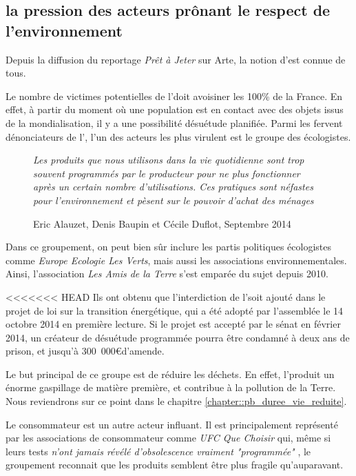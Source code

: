 \subsection{la pression des acteurs prônant le respect de l'environnement }

Depuis la diffusion du reportage \textit{Prêt à Jeter} sur Arte, la notion d'\op est connue de tous. 

Le nombre de victimes potentielles de l'\op doit avoisiner les 100\% de la France. En effet, à partir du moment où une population est en contact avec des objets issus de la mondialisation, il y a une possibilité désuétude planifiée. 
Parmi les fervent dénonciateurs de l'\op, l'un des acteurs les plus virulent est le groupe des écologistes. 

\begin{wrapfigure}{r}{0.3\textwidth}
\vspace{-4mm}\og  \textit{Les produits que nous utilisons dans la vie quotidienne sont trop souvent programmés par le producteur pour ne plus fonctionner après un certain nombre d'utilisations. Ces pratiques sont néfastes pour l'environnement et pèsent sur le pouvoir d'achat des ménages} \fg{} \caption{Eric Alauzet, Denis Baupin et Cécile Duflot, Septembre 2014}
\end{wrapfigure}

Dans ce groupement, on peut bien sûr inclure les partis politiques écologistes  comme \textit{Europe Ecologie Les Verts}, mais aussi les associations environnementales. Ainsi, l'association \textit{Les Amis de la Terre} s'est emparée du sujet depuis 2010. 


<<<<<<< HEAD
Ils ont obtenu que l'interdiction de l'\op soit ajouté dans le projet de loi sur la transition énergétique, qui a été adopté par l'assemblée le 14 octobre 2014 en première lecture. Si le projet est accepté par le sénat en février 2014, un créateur de désuétude programmée pourra être condamné à deux ans de prison, et jusqu'à 300~000\euro d'amende. 

Le but principal de ce groupe est de réduire les déchets. En effet, l'\op produit un énorme gaspillage de matière première, et contribue à la pollution de la Terre. Nous reviendrons sur ce point dans le chapitre \ref{chapter::pb_duree_vie_reduite}.

\medbreak Le consommateur est un autre acteur influant. Il est principalement  représenté par les associations de consommateur comme \textit{UFC Que Choisir} qui, même si leurs tests \og \textit{n'ont jamais révélé d'obsolescence vraiment "programmée" }\fg{}  , le groupement reconnait que les produits semblent être plus fragile qu'auparavant\cite{ufc_OP}. 

